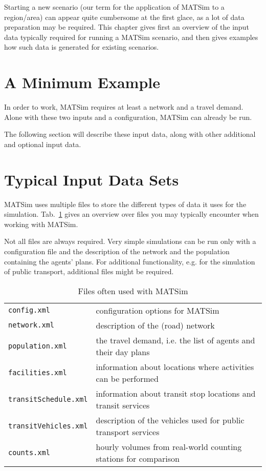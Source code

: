  
\bigskip

\begin{chapter-intro}
Starting a new scenario (our term for the application of MATSim to a 
region/area) can appear quite cumbersome at the first glace, as a lot of data
preparation may be required. This chapter gives first an overview of the input
data typically required for running a MATSim scenario, and then gives examples
how such data is generated for existing scenarios.
\end{chapter-intro}


\section{A Minimum Example}

In order to work, MATSim requires at least a network and a travel demand.
Alone with these two inputs and a configuration, MATSim can already be run.

The following section will describe these input data, along with other additional
and optional input data.




\section{Typical Input Data Sets}
MATSim uses multiple files to store the different types of data it uses for the
simulation. Tab.~\ref{tab:BuildingScenarios:InputDataSets} gives an
overview over files you may typically encounter when working with MATSim.

Not all files are always required. Very simple simulations can be run
only with a configuration file and the description of the network and
the population containing the agents' plans. For additional functionality, e.g.
for the simulation of public transport, additional files might be required.

\begin{table}[htp]
\begin{tabular}{ll}
\hline
{\tt config.xml}          & configuration options for MATSim \\
{\tt network.xml}         & description of the (road) network \\
{\tt population.xml}      & the travel demand, i.e. the list of agents
and their day plans
\\
{\tt facilities.xml}      & information about locations where
activities can be performed\\
{\tt transitSchedule.xml} & information about transit stop locations
and transit services\\
{\tt transitVehicles.xml} & description of the vehicles used for
public transport services\\
{\tt counts.xml}          & hourly volumes from real-world counting
stations for comparison\\
\hline
\end{tabular}
\caption{Files often used with MATSim}
\label{tab:BuildingScenarios:InputDataSets}
\end{table}

